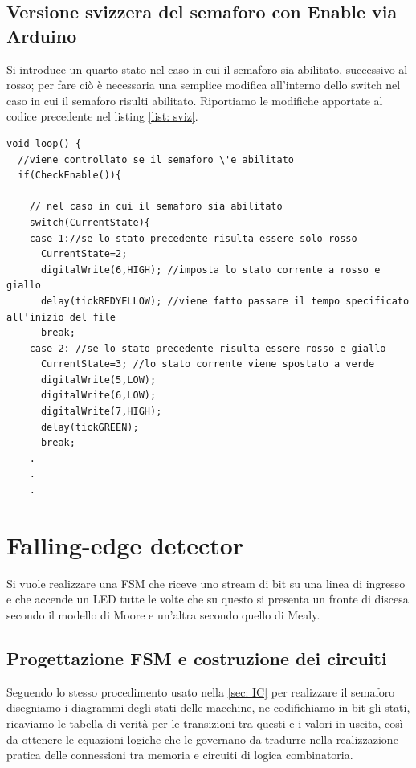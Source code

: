 \documentclass[10pt, a4paper, italian]{article}
\begin{document}
\subsection{Versione svizzera del semaforo con Enable via Arduino}
Si introduce un quarto stato nel caso in cui il semaforo sia abilitato,
successivo al rosso; per fare ciò è necessaria una semplice modifica
all'interno dello switch nel caso in cui il semaforo risulti abilitato.
Riportiamo le modifiche apportate al codice precedente nel listing
\ref{list: sviz}.
\begin{lstlisting}[label={list: sviz}, style=Arduino, caption=Svizzero.ino]
void loop() {
  //viene controllato se il semaforo \'e abilitato
  if(CheckEnable()){ 
    
    // nel caso in cui il semaforo sia abilitato
    switch(CurrentState){  
    case 1://se lo stato precedente risulta essere solo rosso
      CurrentState=2;
      digitalWrite(6,HIGH); //imposta lo stato corrente a rosso e giallo
      delay(tickREDYELLOW); //viene fatto passare il tempo specificato all'inizio del file
      break;
    case 2: //se lo stato precedente risulta essere rosso e giallo
      CurrentState=3; //lo stato corrente viene spostato a verde
      digitalWrite(5,LOW);
      digitalWrite(6,LOW);
      digitalWrite(7,HIGH);  
      delay(tickGREEN); 
      break; 
    .
    .
    .
\end{lstlisting}

\section{Falling-edge detector}
Si vuole realizzare una FSM che riceve uno stream di bit su una linea di
ingresso e che accende un LED tutte le volte che su questo si presenta un
fronte di discesa secondo il modello di Moore e un'altra secondo quello di
Mealy.

\subsection{Progettazione FSM e costruzione dei circuiti}
Seguendo lo stesso procedimento usato nella \cref{sec: IC} per realizzare il
semaforo disegniamo i diagrammi degli stati delle macchine, ne codifichiamo in
bit gli stati, ricaviamo le tabella di verità per le transizioni tra questi e
i valori in uscita, così da ottenere le equazioni logiche che le governano da
tradurre nella realizzazione pratica delle connessioni tra memoria e circuiti
di logica combinatoria.
\end{document}
